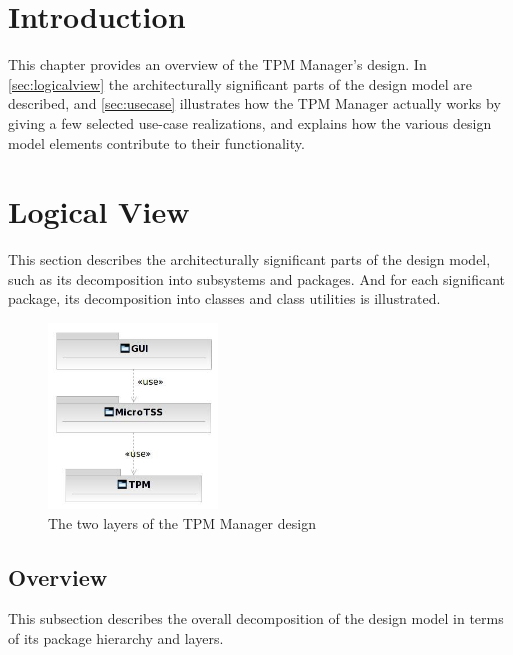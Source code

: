 \documentclass[
  american        %
]{sirrixreport}
\begin{document}
\section{Introduction}
This chapter provides an overview of the TPM Manager's design.
In \autoref{sec:logicalview} the architecturally significant parts of the  design model are described, and \autoref{sec:usecase} 
illustrates how the TPM Manager actually works by giving a few selected use-case realizations, and explains how the various design 
model elements contribute to their functionality.


\section{Logical View} 
\label{sec:logicalview}

This section describes the architecturally significant parts of the
design model, such as its decomposition into subsystems and
packages. And for each significant package, its decomposition into
classes and class utilities is illustrated. 

\begin{figure}[h]
 \centering
 \includegraphics[width=0.4\textwidth]{images/tpmmanager_layers.jpg}
 \caption{The two layers of the TPM Manager design}
 \label{highleveldesign}
\end{figure}
\clearpage

\subsection{Overview}
This subsection describes the overall decomposition of the design model in terms of
its package hierarchy and layers. 
\end{document}
